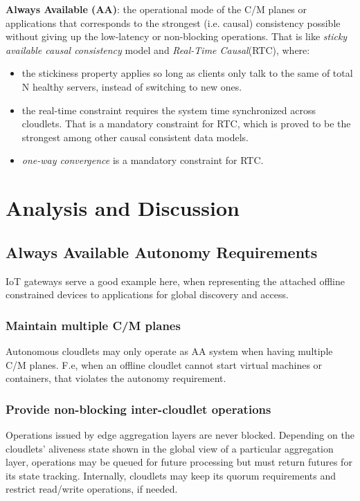 \documentclass[conference]{IEEEtran}
\begin{document}
\textbf{Always Available (AA)}: the operational mode of the C/M planes or
applications that corresponds to the strongest (i.e. causal) consistency
possible without giving up the low-latency or non-blocking operations. That
is like \textit{sticky available causal consistency}\cite{b4} model and
\textit{Real-Time Causal}(RTC)\cite{b2}, where:
\begin{itemize}
  \item the stickiness property applies so long as clients only talk to the
    same of total $\mathrm{N}$ healthy servers, instead of switching to new
    ones.
  \item the real-time constraint requires the system time synchronized across
    cloudlets. That is a mandatory constraint for RTC, which is proved to be
    the strongest among other causal consistent data models.
  \item \textit{one-way convergence}\cite{b2} is a mandatory constraint for
    RTC.
\end{itemize}

\section{Analysis and Discussion}
\subsection{Always Available Autonomy Requirements}
IoT gateways\cite{b27} serve a good example here, when representing the attached
offline constrained devices to applications for global discovery and access.

\subsubsection{Maintain multiple C/M planes}
Autonomous cloudlets may only operate as AA system when having multiple
C/M planes. F.e, when an offline cloudlet cannot start virtual machines
or containers, that violates the autonomy requirement.

\subsubsection{Provide non-blocking inter-cloudlet operations}
Operations issued by edge aggregation layers are never blocked. Depending on
the cloudlets' aliveness state shown in the global view of a particular
aggregation layer, operations may be queued for future processing but must
return futures for its state tracking. Internally, cloudlets may keep its
quorum requirements and restrict read/write operations, if needed.
\end{document}
